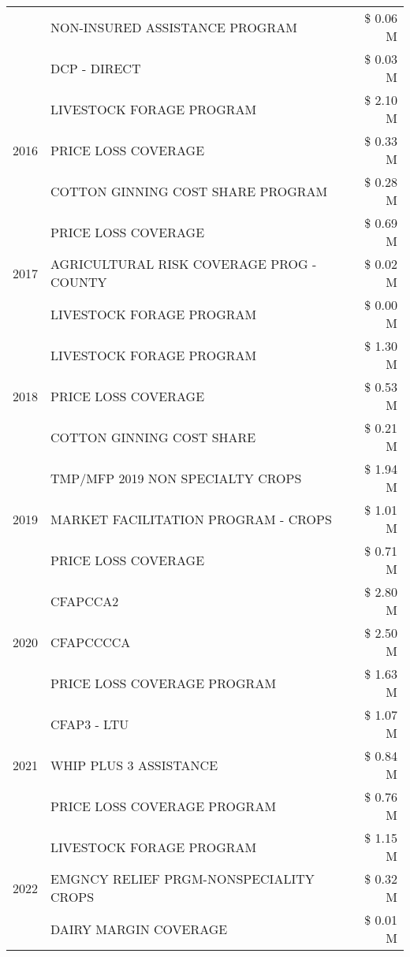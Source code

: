 \begin{tabular}{llr}
 & NON-INSURED ASSISTANCE PROGRAM & \$ 0.06 M \\
 & DCP - DIRECT & \$ 0.03 M \\
\cline{1-3}
\multirow[t]{3}{*}{2016} & LIVESTOCK FORAGE PROGRAM & \$ 2.10 M \\
 & PRICE LOSS COVERAGE & \$ 0.33 M \\
 & COTTON GINNING COST SHARE PROGRAM & \$ 0.28 M \\
\cline{1-3}
\multirow[t]{3}{*}{2017} & PRICE LOSS COVERAGE & \$ 0.69 M \\
 & AGRICULTURAL RISK COVERAGE PROG - COUNTY & \$ 0.02 M \\
 & LIVESTOCK FORAGE PROGRAM & \$ 0.00 M \\
\cline{1-3}
\multirow[t]{3}{*}{2018} & LIVESTOCK FORAGE PROGRAM & \$ 1.30 M \\
 & PRICE LOSS COVERAGE & \$ 0.53 M \\
 & COTTON GINNING COST SHARE & \$ 0.21 M \\
\cline{1-3}
\multirow[t]{3}{*}{2019} & TMP/MFP 2019 NON SPECIALTY CROPS & \$ 1.94 M \\
 & MARKET FACILITATION PROGRAM - CROPS & \$ 1.01 M \\
 & PRICE LOSS COVERAGE & \$ 0.71 M \\
\cline{1-3}
\multirow[t]{3}{*}{2020} & CFAPCCA2 & \$ 2.80 M \\
 & CFAPCCCCA & \$ 2.50 M \\
 & PRICE LOSS COVERAGE PROGRAM & \$ 1.63 M \\
\cline{1-3}
\multirow[t]{3}{*}{2021} & CFAP3 - LTU & \$ 1.07 M \\
 & WHIP PLUS 3 ASSISTANCE & \$ 0.84 M \\
 & PRICE LOSS COVERAGE PROGRAM & \$ 0.76 M \\
\cline{1-3}
\multirow[t]{3}{*}{2022} & LIVESTOCK FORAGE PROGRAM & \$ 1.15 M \\
 & EMGNCY RELIEF PRGM-NONSPECIALITY CROPS & \$ 0.32 M \\
 & DAIRY MARGIN COVERAGE & \$ 0.01 M \\
\cline{1-3}
\bottomrule
\end{tabular}
